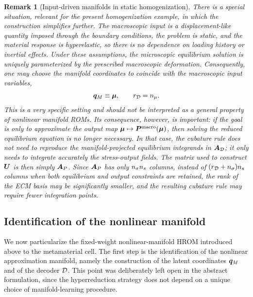 \documentclass[11pt,a4paper]{article}
\newtheorem{remark}{Remark}
\newcommand{\PROMPT}[1]{ }
\begin{document}
\begin{remark}[Input-driven manifolds in static homogenization]
\label{rem:input_driven_manifold}
There is a special situation, relevant for the present homogenization example,
in which the construction simplifies further. The macroscopic input is a
displacement-like quantity imposed through the boundary conditions, the problem
is static, and the material response is hyperelastic, so there is no dependence
on loading history or inertial effects. Under these assumptions, the
microscopic equilibrium solution is uniquely parameterized by the prescribed
macroscopic deformation. Consequently, one may choose the manifold coordinates
to coincide with the macroscopic input variables,
\[
    \bm{q}_M \equiv \bm{\mu},
    \qquad
    r_{\mathcal{D}}=n_{\mu} .
\]
This is a very specific setting and should not be interpreted as a general
property of nonlinear manifold ROMs. Its consequence, however, is important:
if the goal is only to approximate the output map
$\bm{\mu}\mapsto\bm{P}^{\mathrm{macro}}(\bm{\mu})$, then solving the reduced equilibrium equation
is no longer necessary. In that case, the cubature rule does not need to
reproduce the manifold-projected equilibrium integrands in $\bm{A}_{\mathcal{D}}$; it only
needs to integrate accurately the stress-output fields. The matrix used to
construct $\bm{U}$ is then simply $\bm{A}_{P}$. Since $\bm{A}_{P}$ has only
$n_{\sigma}n_s$ columns, instead of $(r_{\mathcal{D}}+n_{\sigma})n_s$ columns when both
equilibrium and output constraints are retained, the rank of the ECM basis may
be significantly smaller, and the resulting cubature rule may require fewer
integration points.
\end{remark}



\PROMPT{}

%
\PROMPT{}
%

\subsection{Identification of the nonlinear  manifold}
\label{subsec:manifold_identification_cell}

We now particularize the fixed-weight nonlinear-manifold HROM introduced above
to the metamaterial cell. The first step is the identification of the
nonlinear approximation manifold, namely the construction of the latent
coordinates $\bm{q}_M$ and of the decoder $\mathcal{\boldsymbol{D}}$. This point was deliberately
left open in the abstract formulation, since the hyperreduction strategy does
not depend on a unique choice of manifold-learning procedure.
\end{document}
